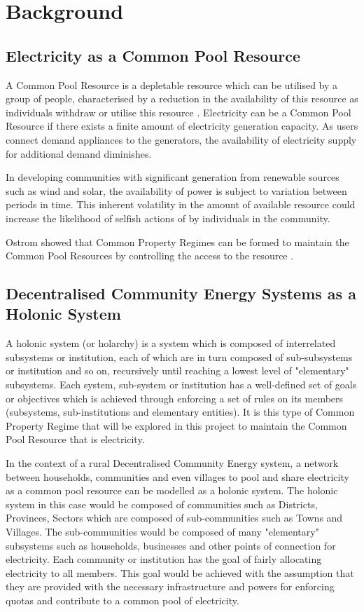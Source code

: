 \chapter{Background}
\label{Background}

\section*{Electricity as a Common Pool Resource}
A Common Pool Resource is a depletable resource which can be utilised by a group of people, characterised by a reduction in the availability of this resource as individuals withdraw or utilise this resource \cite{Ostrom:90}.  Electricity can be a Common Pool Resource if there exists a finite amount of electricity generation capacity. As users connect demand appliances to the generators, the availability of electricity supply for additional demand diminishes.

In developing communities with significant generation from renewable sources such as wind and solar, the availability of power is subject to variation between periods in time. This inherent volatility in the amount of available resource could increase the likelihood of selfish actions of by individuals in the community.

Ostrom showed that Common Property Regimes can be formed to maintain the Common Pool Resources by controlling the access to the resource \cite{Ostrom:90}. 

\section*{Decentralised Community Energy Systems as a Holonic System}
A holonic system (or holarchy) is a system which is composed of interrelated subsystems or institution, each of which are in turn composed of sub-subsystems  or institution and so on, recursively until reaching a lowest level of "elementary" subsystems. Each system, sub-system or institution has a well-defined set of goals or objectives which is achieved through enforcing a set of rules on its members (subsystems, sub-institutions and elementary entities)\cite{Pitt:Holonic_Institutions}. It is this type of Common Property Regime that will be explored in this project to maintain the Common Pool Resource that is electricity. 

In the context of a rural Decentralised Community Energy system, a network between households, communities and even villages to pool and share electricity as a common pool resource can be modelled as a holonic system. The holonic system in this case would be composed of communities such as Districts, Provinces, Sectors which are composed of sub-communities such as Towns and Villages. The sub-communities would be composed of many "elementary" subsystems such as households, businesses and other points of connection for electricity. Each community or institution has the goal of fairly allocating electricity to all members. This goal would be achieved with the assumption that they are provided with the necessary infrastructure and powers for enforcing quotas and contribute to a common pool of electricity.

